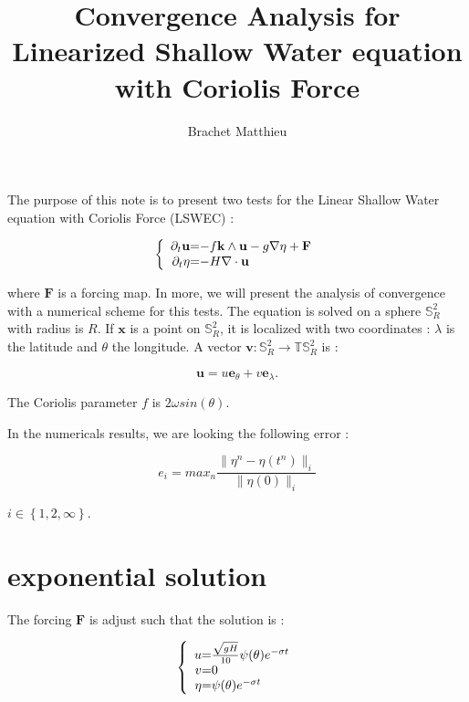 \documentclass[10pt,a4paper]{amsart}
\author{Brachet Matthieu}
\title{Convergence Analysis for Linearized Shallow Water equation with Coriolis Force}
\begin{document}
\maketitle

The purpose of this note is to present two tests for the Linear Shallow Water equation with Coriolis Force (LSWEC) :

\begin{equation}
\label{LSWEC}
\left\lbrace
\begin{array}{r @{=} l}
\partial_t \mathbf{u} & -f \mathbf{k} \wedge \mathbf{u} - g \nabla \eta + \mathbf{F} \\
\partial_t \eta & -H \nabla \cdot \mathbf{u} 
\end{array}
\right.
\end{equation}

where $\mathbf{F}$ is a forcing map. In more, we will present the analysis of convergence with a numerical scheme for this tests.
The equation is solved on a sphere $\mathbb{S}_R^2$ with radius is $R$. If $\mathbf{x}$ is a point on $\mathbb{S}_R^2$, it is localized with two coordinates : $\lambda$ is the latitude and $\theta$ the longitude. A vector $\mathbf{v} : \mathbb{S}_R^2 \rightarrow \mathbb{T}\mathbb{S}_R^2$ is :

$$\mathbf{u} = u \mathbf{e}_{\theta} + v \mathbf{e}_{\lambda}.$$ 

The Coriolis parameter $f$ is $2 \omega sin ( \theta )$.

In the numericals results, we are looking the following error :

$$e_{i} = max_n \dfrac{\| \eta^n - \eta(t^n) \|_{i}}{\| \eta(0) \|_{i}}$$

$i \in \left\lbrace 1, 2, \infty \right\rbrace$.



\section{exponential solution}

The forcing $\mathbf{F}$ is adjust such that the solution is :

\begin{equation}
\left\lbrace
\begin{array}{r @{=} l}
u & \frac{\sqrt{gH}}{10} \psi ( \theta )  e^{-\sigma t} \\
v & 0 \\
\eta & \psi( \theta ) e^{-\sigma t}
\end{array}
\right.
\end{equation}
\end{document}
